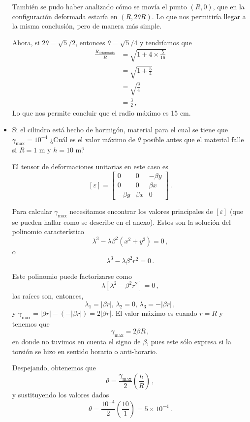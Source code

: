 \documentclass[../notas medios.tex]{subfiles}
\begin{document}
\begin{itemize}
También se pudo haber analizado cómo se movía el punto $(R, 0)$, que en la configuración deformada estaría en $(R, 2\theta R)$. Lo que nos permitiría llegar a la misma conclusión, pero de manera más simple.

Ahora, si $2\theta =\sqrt{5}/2$, entonces $\theta = \sqrt{5}/4$ y tendríamos que
\begin{align*}
  \frac{R_\text{deformado}}{R} &= \sqrt{1 + 4\times \frac{5}{16}} \\
    &= \sqrt{1 + \frac{5}{4}} \\
    &= \sqrt{\frac{9}{4}} \\
    &= \frac{3}{2}\, ,
\end{align*}
Lo que nos permite concluir que el radio máximo es 15 cm.

\item
Si el cilindro está hecho de hormigón, material para el cual se tiene que $\gamma_{\max} = 10^{-4}$ ¿Cuál es el valor máximo de $\theta$ posible antes que el material falle si $R = 1$ m y $h=10$ m?

El tensor de deformaciones unitarias en este caso es
\[[\varepsilon] =\begin{bmatrix}
	0 &0 &-\beta y\\
	0 &0 &\beta x\\
	-\beta y &\beta x &0
    \end{bmatrix}\, .
   \]
   
Para calcular $\gamma_{\max}$ necesitamos encontrar los valores principales de $[\varepsilon]$ (que se pueden hallar como se describe en el anexo). Estos son la solución del polinomio característico
\[\lambda^3 - \lambda \beta^2(x^2 + y^2) = 0\, ,\]
o
\[\lambda^3 - \lambda \beta^2 r^2 = 0\, .\]

Este polinomio puede factorizarse como
\[\lambda[\lambda^2 - \beta^2 r^2] = 0\, ,\]
las raíces son, entonces,
\[\lambda_1 = |\beta r|,\, \lambda_2 = 0,\, \lambda_3 = -|\beta r|\, ,\]
y $\gamma_{\max} = |\beta r| - (-|\beta r|) = 2|\beta r|$. El valor máximo es cuando $r=R$ y tenemos que
\[\gamma_{\max} = 2\beta R\, ,\]
en donde no tuvimos en cuenta el signo de $\beta$, pues este sólo expresa si la torsión se hizo en sentido horario o anti-horario.

Despejando, obtenemos que
\[\theta = \frac{\gamma_{\max}}{2} \left(\frac{h}{R}\right)\, ,\]
y sustituyendo los valores dados
\[\theta = \frac{10^{-4}}{2} \left(\frac{10}{1} \right) = 5\times 10^{-4} \, .\]

\end{itemize}
\end{document}
